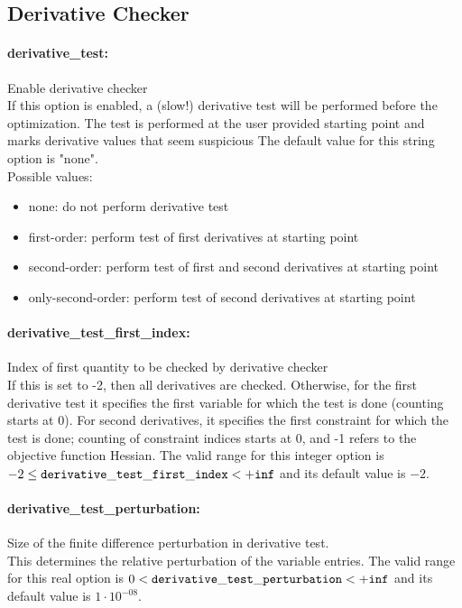 \subsection{Derivative Checker}
\label{sec:Derivative_Checker}
\paragraph{derivative\_test:}\label{sec:derivative_test} Enable derivative checker $\;$ \\
 If this option is enabled, a (slow!) derivative
test will be performed before the optimization. 
The test is performed at the user provided
starting point and marks derivative values that
seem suspicious
The default value for this string option is "none".
\\ 
Possible values:
\begin{itemize}
   \item none: do not perform derivative test
   \item first-order: perform test of first derivatives at starting
point
   \item second-order: perform test of first and second derivatives at
starting point
   \item only-second-order: perform test of second derivatives at starting
point
\end{itemize}

\paragraph{derivative\_test\_first\_index:}\label{sec:derivative_test_first_index} Index of first quantity to be checked by derivative checker $\;$ \\
 If this is set to -2, then all derivatives are
checked.  Otherwise, for the first derivative
test it specifies the first variable for which
the test is done (counting starts at 0).  For
second derivatives, it specifies the first
constraint for which the test is done; counting
of constraint indices starts at 0, and -1 refers
to the objective function Hessian. The valid range for this integer option is
$-2 \le {\tt derivative\_test\_first\_index } <  {\tt +inf}$
and its default value is $-2$.


\paragraph{derivative\_test\_perturbation:}\label{sec:derivative_test_perturbation} Size of the finite difference perturbation in derivative test. $\;$ \\
 This determines the relative perturbation of the
variable entries. The valid range for this real option is 
$0 <  {\tt derivative\_test\_perturbation } <  {\tt +inf}$
and its default value is $1 \cdot 10^{-08}$.


